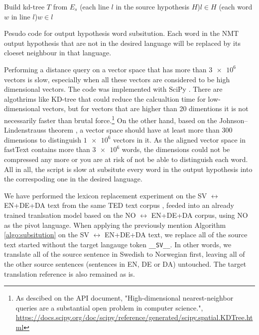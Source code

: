 \documentclass[thesis,fonts=libertine]{cluu}
\begin{document}
\begin{algorithm}[H]
  \SetAlgoLined

  Build kd-tree $T$ from $E_s$
  \For(each line $l$ in the source hypothesis $H$){$l \in H$}{
    \For(each word $w$ in line $l$){$w \in l$}{
    }
  }
  \caption{Pesudo code for output hypothesis word subsitution. Each word in the NMT output hypothesis that are not in the desired language will be replaced by its cloeset neighbour in that language.}
  \label{algo:subsitution}
\end{algorithm}

Performing a distance query on a vector space that has more than $\num{3e6}$ vectors is slow, especially when all these vectors are considered to be high dimensional vectors. The code was implemented with SciPy \parencite{Virtanen:2019aa}. There are algothrims like KD-tree \parencite{Maneewongvatana:aa} that could reduce the calcualtion time for low-dimensional vectors, but for vectors that are higher than 20 dimentions it is not necessarily faster than brutal force.\footnote{As descibed on the API document, "High-dimensional nearest-neighbor queries are a substantial open problem in computer science.", \url{https://docs.scipy.org/doc/scipy/reference/generated/scipy.spatial.KDTree.html}} On the other hand, based on the Johnson–Lindenstrauss theorem \parencite{johnson1984extensions}, a vector space should have at least more than 300 dimensions to distinguish $\num{1e6}$ vectors in it. As the aligned vector space in fastText contains more than $\num{3e6}$ words, the dimensions could not be compressed any more or you are at risk of not be able to distinguish each word. All in all, the script is slow at subsitute every word in the output hypothesis into the correspoding one in the desired language.

We have performed the lexicon replacement experiment on the SV $\leftrightarrow$ EN+DE+DA text from the same TED text corpus \parencite{Qi:2018aa}, feeded into an already trained tranlsation model based on the NO $\leftrightarrow$ EN+DE+DA corpus, using NO as the pivot language. When applying the previously mention Algorithm \ref{algo:subsitution} on the SV $\leftrightarrow$ EN+DE+DA text, we replace all of the source text started without the target langauge token \verb|__SV__|. In other words, we translate all of the source sentence in Swedish to Norwegian first, leaving all of the other source sentences (sentences in EN, DE or DA) untouched. The target translation reference is also remained as is. 
\end{document}
